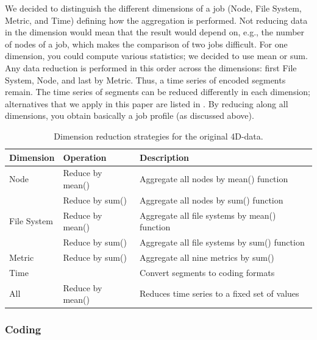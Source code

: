 \documentclass{jhps}
\begin{document}
We decided to distinguish the different dimensions of a job (Node, File System, Metric, and Time) defining how the aggregation is performed.
Not reducing data in the dimension would mean that the result would depend on, e.g., the number of nodes of a job, which makes the comparison of two jobs difficult.
For one dimension, you could compute various statistics; we decided to use mean or sum.
Any data reduction is performed in this order across the dimensions: first File System, Node, and last by Metric.
Thus, a time series of encoded segments remain.
The time series of segments can be reduced differently in each dimension; alternatives that we apply in this paper are listed in .
By reducing along all dimensions, you obtain basically a job profile (as discussed above).

\begin{table}
	\centering
	\begin{tabularx}{\textwidth}{llX}
		Dimension       & Operation                                    &  Description                                   \\
		\midrule
		Node            & Reduce by mean()                             &  Aggregate all nodes by mean() function        \\
		                & Reduce by sum()                              &  Aggregate all nodes by sum() function         \\
		File System     & Reduce by mean()                             &  Aggregate all file systems by mean() function \\
		                &
		Reduce by sum() & Aggregate all file systems by sum() function \\
		Metric          & Reduce by sum()                              &  Aggregate all nine metrics by sum()           \\
		Time            &                                              &  Convert segments to coding formats            \\
		All             & Reduce by mean()                             &  Reduces time series to a fixed set of values  \\
	\end{tabularx}
	\caption{Dimension reduction strategies for the original 4D-data.}
	\label{tab:reduction_techniques}
\end{table}

\subsubsection{Coding}
\end{document}
